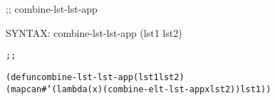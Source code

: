 \begin{aibox}{\function}
;; combine-lst-lst-app

SYNTAX: combine-lst-lst-app (lst1 lst2)
\end{aibox}

\begin{aibox}{\examples}
\begin{alltt}
\end{alltt}

\end{aibox}

\begin{aibox}{\comments}

\end{aibox}
\begin{aibox}{\answers}

\end{aibox}
\begin{aibox}{\othercomments}

\end{aibox}
\begin{aibox}{\pseudocode}

\end{aibox}
\begin{aibox}{\code}

\begin{alltt}
;;%% code

(defun combine-lst-lst-app (lst1 lst2)
            (mapcan #'(lambda (x) (combine-elt-lst-app x lst2)) lst1))

\end{alltt}
\end{aibox}

